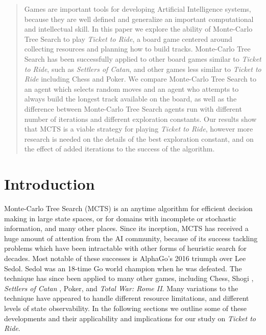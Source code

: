 \documentclass[11pt, letterpaper, twoside]{article}
\begin{document}
\maketitle

\begin{abstract}
	Games are important tools for developing Artificial Intelligence systems, because they are well defined and generalize an important computational and intellectual skill. In this paper we explore the ability of Monte-Carlo Tree Search to play \textit{Ticket to Ride}, a board game centered around collecting resources and planning how to build tracks. Monte-Carlo Tree Search has been successfully applied to other board games similar to \textit{Ticket to Ride}, such as \textit{Settlers of Catan}, and other games less similar to \textit{Ticket to Ride} including Chess and Poker. We compare Monte-Carlo Tree Search to an agent which selects random moves and an agent who attempts to always build the longest track available on the board, as well as the difference between Monte-Carlo Tree Search agents run with different number of iterations and different exploration constants. Our results show that MCTS is a viable strategy for playing \textit{Ticket to Ride}, however more research is needed on the details of the best exploration constant, and on the effect of added iterations to the success of the algorithm.
\end{abstract}

\section{Introduction}

Monte-Carlo Tree Search (MCTS) \cite{mcts_inaugural} is an anytime algorithm for efficient decision making in large state spaces, or for domains with incomplete or stochastic information, and many other places. Since its inception, MCTS has received a huge amount of attention from the AI community, because of its success tackling problems which have been intractable with other forms of heuristic search for decades. Most notable of these successes is AlphaGo's \cite{alphago} 2016 triumph over Lee Sedol. Sedol was an 18-time Go world champion when he was defeated. The technique has since been applied to many other games, including Chess, Shogi \cite{chess_shogi_self_play}, \textit{Settlers of Catan} \cite{mcts_settlers}, Poker, and \textit{Total War: Rome II}. Many variations to the technique have appeared to handle different resource limitations, and different levels of state observability. In the following sections we outline some of these developments and their applicability and implications for our study on \textit{Ticket to Ride}.
\end{document}
